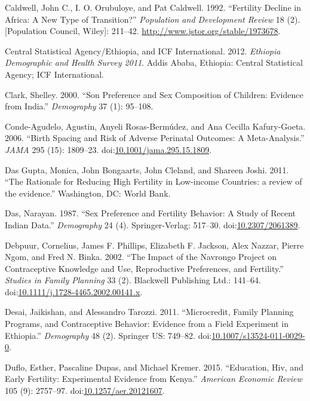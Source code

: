 \documentclass[]{article}
\begin{document}
\hypertarget{ref-Caldwell1992}{}
Caldwell, John C., I. O. Orubuloye, and Pat Caldwell. 1992. ``Fertility Decline in Africa: A New Type of Transition?'' \emph{Population and Development Review} 18 (2). {[}Population Council, Wiley{]}: 211--42. \url{http://www.jstor.org/stable/1973678}.

\hypertarget{ref-Central-Statistical-Agencyux2fEthiopia2012}{}
Central Statistical Agency/Ethiopia, and ICF International. 2012. \emph{Ethiopia Demographic and Health Survey 2011}. Addis Ababa, Ethiopia: Central Statistical Agency; ICF International.

\hypertarget{ref-clark00}{}
Clark, Shelley. 2000. ``Son Preference and Sex Composition of Children: Evidence from India.'' \emph{Demography} 37 (1): 95--108.

\hypertarget{ref-Conde-Agudelo2006}{}
Conde-Agudelo, Agustin, Anyeli Rosas-Bermúdez, and Ana Cecilla Kafury-Goeta. 2006. ``Birth Spacing and Risk of Adverse Perinatal Outcomes: A Meta-Analysis.'' \emph{JAMA} 295 (15): 1809--23. doi:\href{https://doi.org/10.1001/jama.295.15.1809}{10.1001/jama.295.15.1809}.

\hypertarget{ref-DasGupta2011}{}
Das Gupta, Monica, John Bongaarts, John Cleland, and Shareen Joshi. 2011. ``The Rationale for Reducing High Fertility in Low-income Countries: a review of the evidence.'' Washington, DC: World Bank.

\hypertarget{ref-Das1987}{}
Das, Narayan. 1987. ``Sex Preference and Fertility Behavior: A Study of Recent Indian Data.'' \emph{Demography} 24 (4). Springer-Verlag: 517--30. doi:\href{https://doi.org/10.2307/2061389}{10.2307/2061389}.

\hypertarget{ref-Debpuur2002}{}
Debpuur, Cornelius, James F. Phillips, Elizabeth F. Jackson, Alex Nazzar, Pierre Ngom, and Fred N. Binka. 2002. ``The Impact of the Navrongo Project on Contraceptive Knowledge and Use, Reproductive Preferences, and Fertility.'' \emph{Studies in Family Planning} 33 (2). Blackwell Publishing Ltd.: 141--64. doi:\href{https://doi.org/10.1111/j.1728-4465.2002.00141.x}{10.1111/j.1728-4465.2002.00141.x}.

\hypertarget{ref-Desai2011}{}
Desai, Jaikishan, and Alessandro Tarozzi. 2011. ``Microcredit, Family Planning Programs, and Contraceptive Behavior: Evidence from a Field Experiment in Ethiopia.'' \emph{Demography} 48 (2). Springer US: 749--82. doi:\href{https://doi.org/10.1007/s13524-011-0029-0}{10.1007/s13524-011-0029-0}.

\hypertarget{ref-Duflo2015}{}
Duflo, Esther, Pascaline Dupas, and Michael Kremer. 2015. ``Education, Hiv, and Early Fertility: Experimental Evidence from Kenya.'' \emph{American Economic Review} 105 (9): 2757--97. doi:\href{https://doi.org/10.1257/aer.20121607}{10.1257/aer.20121607}.
\end{document}
